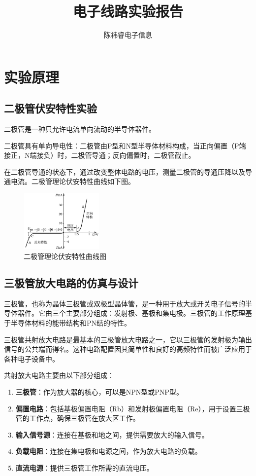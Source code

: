 \documentclass[]{article}
\title{电子线路实验报告}
\author{陈祎睿\quad 电子信息\quad 2023302121299}
\begin{document}
\maketitle




\section{实验原理}

\subsection{二极管伏安特性实验}
二极管是一种只允许电流单向流动的半导体器件。

二极管具有单向导电性：二极管由P型和N型半导体材料构成，当正向偏置（P端接正，N端接负）时，二极管导通；反向偏置时，二极管截止。

在二极管导通的状态下，通过改变整体电路的电压，测量二极管的导通压降以及导通电流。二极管理论伏安特性曲线如下图。

\begin{figure}[htbp]
	\centering
	\includegraphics[height=3cm]{img/2_1}
	\caption{二极管理论伏安特性曲线图}
\end{figure}

\subsection{三极管放大电路的仿真与设计}

三极管，也称为晶体三极管或双极型晶体管，是一种用于放大或开关电子信号的半导体器件。它由三个主要部分组成：发射极、基极和集电极。三极管的工作原理基于半导体材料的能带结构和PN结的特性。

三极管共射放大电路是最基本的三极管放大电路之一，它以三极管的发射极为输出信号的公共端而得名。这种电路配置因其简单性和良好的高频特性而被广泛应用于各种电子设备中。

共射放大电路主要由以下部分组成：

\begin{enumerate}
	\item \textbf{三极管}：作为放大器的核心，可以是NPN型或PNP型。
	\item \textbf{偏置电路}：包括基极偏置电阻（Rb）和发射极偏置电阻（Re），用于设置三极管的工作点，确保三极管在放大区工作。
	\item \textbf{输入信号源}：连接在基极和地之间，提供需要放大的输入信号。
	\item \textbf{负载电阻}：连接在集电极和电源之间，作为放大电路的负载。
	\item \textbf{直流电源}：提供三极管工作所需的直流电压。
\end{enumerate}
\end{document}
